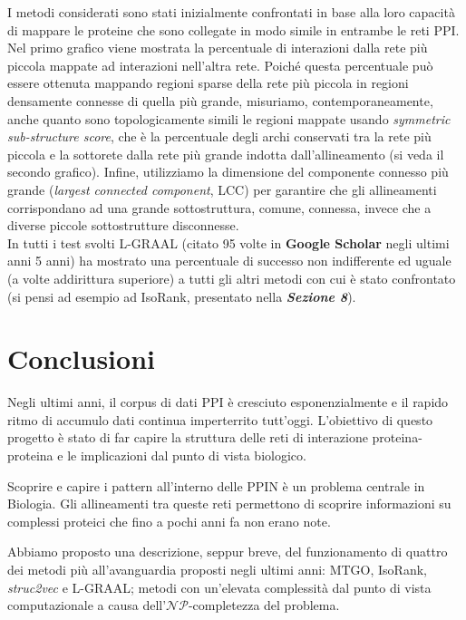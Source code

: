 \documentclass[11pt]{article}
\begin{document}
I metodi considerati sono stati inizialmente confrontati in base alla loro capacità di mappare le proteine che sono collegate in modo simile in entrambe le reti PPI. Nel primo grafico viene mostrata la percentuale di interazioni dalla rete più piccola mappate ad interazioni nell'altra rete. Poiché questa percentuale può essere ottenuta mappando regioni sparse della rete più piccola in regioni densamente connesse di quella più grande, misuriamo, contemporaneamente, anche quanto sono topologicamente simili  le regioni mappate usando \textit{symmetric sub-structure score}, che è la percentuale degli archi conservati tra la rete più piccola e la sottorete dalla rete più grande indotta dall'allineamento (si veda il secondo grafico). Infine, utilizziamo la dimensione del componente connesso più grande (\textit{largest connected component}, LCC) per garantire che gli allineamenti corrispondano ad una grande sottostruttura, comune, connessa, invece che a diverse piccole sottostrutture disconnesse.\\

In tutti i test svolti L-GRAAL (citato 95 volte in \textbf{Google Scholar} negli ultimi anni 5 anni) ha mostrato una percentuale di successo non indifferente ed uguale (a volte addirittura superiore) a tutti gli altri metodi con cui è stato confrontato (si pensi ad esempio ad IsoRank, presentato nella \textit{\textbf{Sezione 8}}).

\pagebreak
\section{Conclusioni}
Negli ultimi anni, il corpus di dati PPI è cresciuto esponenzialmente e il rapido ritmo di accumulo dati continua imperterrito tutt'oggi. L'obiettivo di questo progetto è stato di far capire la struttura delle reti di interazione proteina-proteina e le implicazioni dal punto di vista biologico.

Scoprire e capire i pattern all'interno delle PPIN è un problema centrale in Biologia. Gli allineamenti tra queste reti permettono di scoprire informazioni su complessi proteici che fino a pochi anni fa non erano note. 

Abbiamo proposto una descrizione, seppur breve, del funzionamento di quattro dei metodi più all'avanguardia proposti negli ultimi anni: MTGO, IsoRank, \textit{struc2vec} e L-GRAAL; metodi con un'elevata complessità dal punto di vista computazionale a causa dell'$\mathcal{NP}$-completezza del problema.\\
\end{document}
